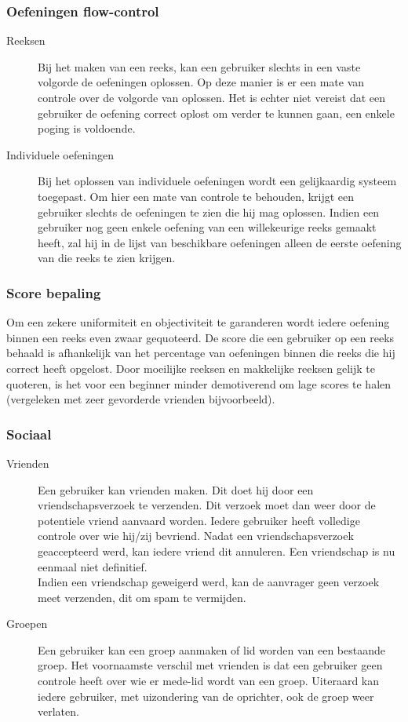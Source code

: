 \subsubsection{Oefeningen flow-control}
\begin{description}
\item[Reeksen] Bij het maken van een reeks, kan een gebruiker slechts in een vaste volgorde de oefeningen oplossen. Op deze manier is er
een mate van controle over de volgorde van oplossen. Het is echter niet vereist dat een gebruiker de oefening correct oplost
om verder te kunnen gaan, een enkele poging is voldoende.
\item[Individuele oefeningen] Bij het oplossen van individuele oefeningen wordt een gelijkaardig systeem toegepast. Om hier een mate van controle te behouden,
krijgt een gebruiker slechts de oefeningen te zien die hij mag oplossen. Indien een gebruiker nog geen enkele oefening van een
willekeurige reeks gemaakt heeft, zal hij in de lijst van beschikbare oefeningen alleen de eerste oefening van die reeks te zien
krijgen.
\end{description}

\subsubsection{Score bepaling}
Om een zekere uniformiteit en objectiviteit te garanderen wordt iedere oefening binnen een reeks even zwaar gequoteerd. De score
die een gebruiker op een reeks behaald is afhankelijk van het percentage van oefeningen binnen die reeks die hij correct heeft opgelost.
Door moeilijke reeksen en makkelijke reeksen gelijk te quoteren, is het voor een beginner minder demotiverend om lage scores te halen
(vergeleken met zeer gevorderde vrienden bijvoorbeeld).

\subsubsection{Sociaal}
\begin{description}
\item[Vrienden] Een gebruiker kan vrienden maken. Dit doet hij door een vriendschapsverzoek te verzenden. Dit verzoek moet dan weer door
de potentiele vriend aanvaard worden. Iedere gebruiker heeft volledige controle over wie hij/zij bevriend. Nadat een vriendschapsverzoek
geaccepteerd werd, kan iedere vriend dit annuleren. Een vriendschap is nu eenmaal niet definitief. \\
Indien een vriendschap geweigerd werd, kan de aanvrager geen verzoek meet verzenden, dit om spam te vermijden.
\item[Groepen] Een gebruiker kan een groep aanmaken of lid worden van een bestaande groep. Het voornaamste verschil met vrienden is dat
een gebruiker geen controle heeft over wie er mede-lid wordt van een groep. Uiteraard kan iedere gebruiker, met uizondering van de oprichter,
ook de groep weer verlaten.
\end{description}
